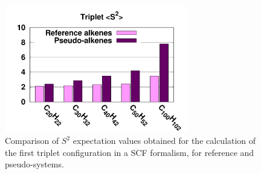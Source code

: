\documentclass[12pt]{article}
\begin{document}
\begin{figure}
\begin{center}
\includegraphics[width=8cm]{long_pbe0_s2}
\end{center}
\vspace{0.25in}
\hspace*{3in}
\caption{Comparison of $S^2$ expectation values obtained for the calculation
of the first triplet configuration in a SCF formalism, for reference
and pseudo-systems.}
\label{fig:ssquare}
\end{figure}

\end{document}
